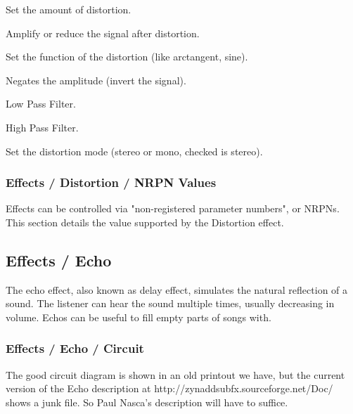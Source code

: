    \setcounter{ItemCounter}{0}      %

   Set the amount of distortion.

   Amplify or reduce the signal after distortion.

   Set the function of the distortion (like arctangent, sine).

   Negates the amplitude (invert the signal).

   Low Pass Filter.

   High Pass Filter.

   Set the distortion mode (stereo or mono, checked is stereo).

\subsubsection{Effects / Distortion / NRPN Values}
\label{subsubsec:effects_edit_distortion_nrpn}

   Effects can be controlled via "non-registered parameter numbers", or NRPNs.
   This section details the value supported by the Distortion effect.

\subsection{Effects / Echo}
\label{subsec:effects_edit_echo}

   The echo effect, also known as delay effect, simulates the natural
   reflection of a sound. The listener can hear the sound multiple times,
   usually decreasing in volume. Echos can be useful to fill empty parts of
   songs with.

\subsubsection{Effects / Echo / Circuit}
\label{subsubsec:effects_edit_echo_circuit}

   The good circuit diagram is shown in an old printout we have, but the
   current version of the Echo description at
   http://zynaddsubfx.sourceforge.net/Doc/ shows a
   junk file.  So Paul Nasca's description will have to suffice.



